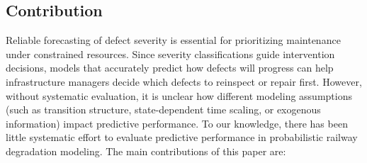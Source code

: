 \subsection{Contribution}
Reliable forecasting of defect severity is essential for prioritizing maintenance under constrained resources. Since severity classifications guide intervention decisions, models that accurately predict how defects will progress can help infrastructure managers decide which defects to reinspect or repair first. However, without systematic evaluation, it is unclear how different modeling assumptions (such as transition structure, state-dependent time scaling, or exogenous information) impact predictive performance. To our knowledge, there has been little systematic effort to evaluate predictive performance in probabilistic railway degradation modeling. 
The main contributions of this paper are:

